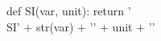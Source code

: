 \begin{pycode}
def SI(var, unit):
    return '\\SI{' + str(var) + '}{' + unit + '}'
\end{pycode}

\newcommand{\pySI}[2]{\py{'\\SI{' + str(#1) + '}{#2}'}}

